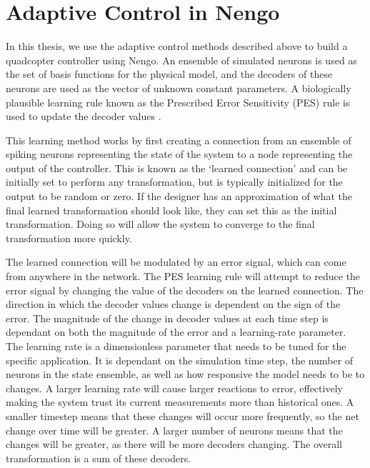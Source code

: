 \documentclass[letterpaper,12pt,titlepage,oneside,final]{book}
\begin{document}
\section{Adaptive Control in Nengo}


In this thesis, we use the adaptive control methods described above to build a quadcopter controller using Nengo. 
An ensemble of simulated neurons is used as the set of basis functions for the physical model, and the decoders of these neurons are used as the vector of unknown constant parameters. 
A biologically plausible learning rule known as the Prescribed Error Sensitivity (PES) rule is used to update the decoder values \cite{bekolay2013simultaneous}. 

This learning method works by first creating a connection from an ensemble of spiking neurons representing the state of the system to a node representing the output of the controller. 
This is known as the `learned connection' and can be initially set to perform any transformation, but is typically initialized for the output to be random or zero. 
If the designer has an approximation of what the final learned transformation should look like, they can set this as the initial transformation. 
Doing so will allow the system to converge to the final transformation more quickly.

The learned connection will be modulated by an error signal, which can come from anywhere in the network. 
The PES learning rule will attempt to reduce the error signal by changing the value of the decoders on the learned connection. 
The direction in which the decoder values change is dependent on the sign of the error. 
The magnitude of the change in decoder values at each time step is dependant on both the magnitude of the error and a learning-rate parameter. 
The learning rate is a dimensionless parameter that needs to be tuned for the specific application. 
It is dependant on the simulation time step, the number of neurons in the state ensemble, as well as how responsive the model needs to be to changes. 
A larger learning rate will cause larger reactions to error, effectively making the system trust its current measurements more than historical ones. 
A smaller timestep means that these changes will occur more frequently, so the net change over time will be greater. 
A larger number of neurons means that the changes will be greater, as there will be more decoders changing. The overall transformation is a sum of these decoders. 
\end{document}
